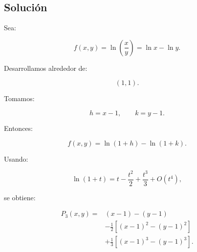 \documentclass[11pt,a4paper]{article}
\begin{document}
\subsection{Solución}

Sea:

\[
f(x,y)
=
\ln\left(\frac xy\right)
=
\ln x-\ln y.
\]

Desarrollamos alrededor de:

\[
(1,1).
\]

Tomamos:

\[
h=x-1,
\qquad
k=y-1.
\]

Entonces:

\[
f(x,y)
=
\ln(1+h)-\ln(1+k).
\]

Usando:

\[
\ln(1+t)
=
t-\frac{t^2}{2}+\frac{t^3}{3}+O(t^4),
\]

se obtiene:

\[
\boxed{
\begin{aligned}
P_3(x,y)
={}&
(x-1)-(y-1)\\
&-
\frac12
\left[
(x-1)^2-(y-1)^2
\right]\\
&+
\frac13
\left[
(x-1)^3-(y-1)^3
\right].
\end{aligned}
}
\]
\end{document}
